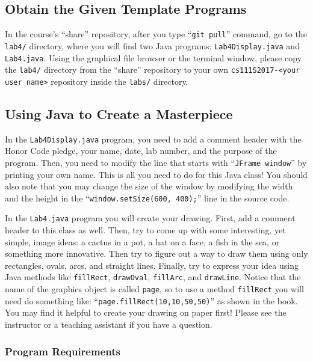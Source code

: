 \vspace{-0.05in}
\subsection*{Obtain the Given Template Programs}
\vspace{-0.05in}

In the course's ``share'' repository, after you type ``{\tt git pull}'' command, go to the {\tt lab4/} directory, where
you will find two Java programs: {\tt Lab4Display.java} and {\tt Lab4.java}. Using the graphical file browser or the
terminal window, please copy the {\tt lab4/} directory from the ``share'' repository to your own {\tt cs111S2017-<your user
name>} repository inside the {\tt labs/} directory.

\subsection*{Using Java to Create a Masterpiece}

In the {\tt Lab4Display.java} program, you need to add a comment header with the Honor Code pledge, your name, date, lab
number, and the purpose of the program. Then, you need to modify the line that starts with ``{\tt JFrame window}'' by
printing your own name. This is all you need to do for this Java class! You should also note that you may change the size of
the window by modifying the width and the height in the ``{\tt window.setSize(600, 400);}'' line in the source code.

In the {\tt Lab4.java} program you will create your drawing. First, add a comment header to this class as well.  Then,
try to come up with some interesting, yet simple, image ideas: a cactus in a pot, a hat on a face, a fish in the sea, or
something more innovative.  Then try to figure out a way to draw them using only rectangles, ovals, arcs, and straight
lines.  Finally, try to express your idea using Java methods like {\tt fillRect}, {\tt drawOval}, {\tt fillArc}, and
{\tt drawLine}. Notice that the name of the graphics object is called {\tt page}, so to use a method {\tt fillRect} you
will need do something like: ``{\tt page.fillRect(10,10,50,50)}'' as shown in the book.  You may find it helpful to create
your drawing on paper first! Please see the instructor or a teaching assistant if you have a question.

\vspace*{-.1in}
\subsubsection*{Program Requirements}

